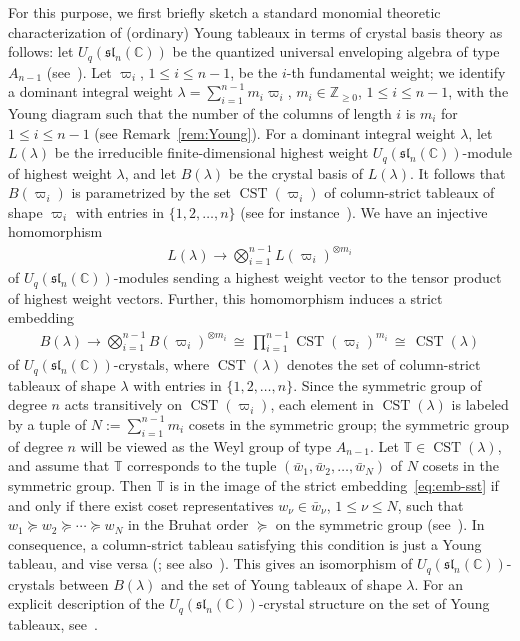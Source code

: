 \documentclass[ALCO,ThmDefs,Unicode,epreuves]{cedram}
\newcommand{\BC}{\mathbb{C}}
\newcommand{\BZ}{\mathbb{Z}}
\DeclareMathOperator{\CST}{CST}
\begin{document}
For this purpose, 
we first briefly sketch a standard monomial theoretic characterization 
of (ordinary) Young tableaux 
in terms of crystal basis theory as follows: 
let 
$U_q(\mathfrak{sl}_n(\BC))$ 
be the quantized universal enveloping algebra of type $A_{n-1}$ (see~\cite[\S~4.8 TABLE Fin]{Kac}).
Let $\varpi_i$, $1 \leq i \leq n-1$, be the $i$-th fundamental weight; 
we identify a dominant integral weight 
$\lambda = \sum_{i=1}^{n-1} m_i \varpi_i$, 
$m_i \in \BZ_{\geq 0}$, $1 \leq i \leq n-1$, 
with the Young diagram such that 
the number of the columns of length $i$ is $m_i$ for $1 \leq i \leq n-1$
(see Remark~\ref{rem:Young}). 
For a dominant integral weight 
$\lambda$, 
let 
$L(\lambda)$ 
be the irreducible finite-dimensional highest weight 
$U_q(\mathfrak{sl}_n(\BC))$-module of highest weight 
$\lambda$, 
and let 
$B(\lambda)$ 
be the crystal basis of 
$L(\lambda)$. 
It follows that 
$B(\varpi_i)$ 
is parametrized by the set 
$\CST (\varpi_i)$ 
of column-strict tableaux of shape 
$\varpi_i$
with entries in 
$\{ 1,2,\ldots ,n \}$
(see for instance~\cite[Proposition~3.3.1~(i)]{KN}). 
We have an injective homomorphism 
\begin{align} \label{eq:emb-hwm}
L(\lambda) \longrightarrow \bigotimes_{i=1}^{n-1} L(\varpi_i)^{\otimes m_i}
\end{align}
of $U_q(\mathfrak{sl}_n(\BC))$-modules 
sending a highest weight vector to the tensor product of highest weight vectors. 
Further, this homomorphism induces a strict embedding 
\begin{align} \label{eq:emb-sst}
B(\lambda) \longrightarrow \bigotimes_{i = 1}^{n-1} B(\varpi_i)^{\otimes m_i} 
\, \cong \, 
\prod_{i=1}^{n-1} \CST (\varpi_i)^{m_i}
\, \cong \, 
\CST (\lambda) 
\end{align}
of $U_q(\mathfrak{sl}_n(\BC))$-crystals, 
where 
$\CST (\lambda)$ 
denotes the set of column-strict tableaux of shape $\lambda$ with entries in $\{ 1,2,\ldots ,n \}$. 
Since the symmetric group of degree $n$ acts transitively on 
$\CST (\varpi_i)$, 
each element in 
$\CST (\lambda)$ 
is labeled by a tuple of 
$N := \sum_{i=1}^{n-1} m_i$ 
cosets in the symmetric group; 
the symmetric group of degree $n$ will be 
viewed as the Weyl group of type $A_{n-1}$. 
Let $\mathbb{T} \in \CST (\lambda)$, 
and assume that $\mathbb{T}$ corresponds to the tuple 
$(\bar{w}_1 , \bar{w}_2 , \ldots , \bar{w}_N)$
of $N$ cosets in the symmetric group. 
Then 
$\mathbb{T}$ 
is in the image of the strict embedding~\eqref{eq:emb-sst} 
if and only if there exist coset representatives 
$w_{\nu} \in \bar{w}_{\nu}$, $1 \leq \nu \leq N$, 
such that
$w_1 \succeq w_2 \succeq \cdots \succeq w_N$ 
in the Bruhat order $\succeq$ on the symmetric group
(see~\cite[Theorem~10.1]{L96}). 
In consequence, a column-strict tableau satisfying this condition 
is just a Young tableau, and vise versa
(\cite[Theorem~2.6.3 (Tableau Criterion)]{BB}; 
see also~\cite[Theorem~3.4.2~(i)]{KN}). 
This gives an isomorphism of 
$U_q(\mathfrak{sl}_n(\BC))$-crystals 
between 
$B(\lambda)$ 
and the set of Young tableaux of shape $\lambda$. 
For an explicit description of the $U_q(\mathfrak{sl}_n(\BC))$-crystal structure on
the set of Young tableaux, see~\cite[Theorem~3.4.2~(ii)]{KN}.
\end{document}
